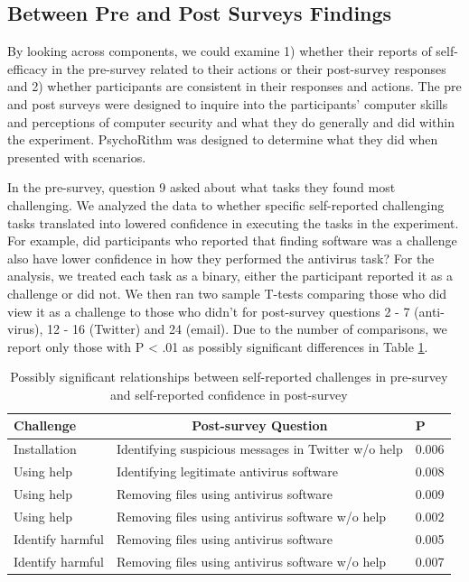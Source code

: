 \subsection{Between Pre and Post Surveys Findings}
By looking across components, we could examine 1) whether their reports of self-efficacy in the pre-survey related to their actions or their post-survey responses and 2) whether participants are consistent in their responses and actions. The pre and post surveys were designed to inquire into the participants' computer skills and perceptions of computer security and what they do generally and did within the experiment. PsychoRithm was designed to determine what they did when presented with scenarios.

In the pre-survey, question 9 asked about what tasks they found most challenging. We analyzed the data to whether specific self-reported challenging tasks translated into lowered confidence in executing the tasks in the experiment. For example, did participants who reported that finding software was a challenge also have lower confidence in how they performed the antivirus task? For the analysis, we treated each task as a binary, either the participant reported it as a challenge or did not. We then ran two sample T-tests comparing those who did view it as a challenge to those who didn't for post-survey questions 2 - 7 (anti-virus), 12 - 16 (Twitter) and 24 (email). Due to the number of comparisons, we report only those with P < .01 as possibly significant differences in Table \ref{tab:prepostchallenges}.

\begin{table}[ht]
\begin{tabular}{|lll|}
\hline
Challenge        & \multicolumn{1}{c}{Post-survey Question}            & P     \\ \hline
Installation     & Identifying suspicious messages in Twitter w/o help & 0.006 \\
Using help       & Identifying legitimate antivirus software           & 0.008 \\
Using help       & Removing files using antivirus software             & 0.009 \\
Using help       & Removing files using antivirus software w/o help    & 0.002 \\
Identify harmful & Removing files using antivirus software             & 0.005 \\
Identify harmful & Removing files using antivirus software w/o help    & 0.007 \\ \hline
\end{tabular}
\caption{Possibly significant relationships between self-reported challenges in pre-survey and self-reported confidence in post-survey}
\label{tab:prepostchallenges}
\end{table}


